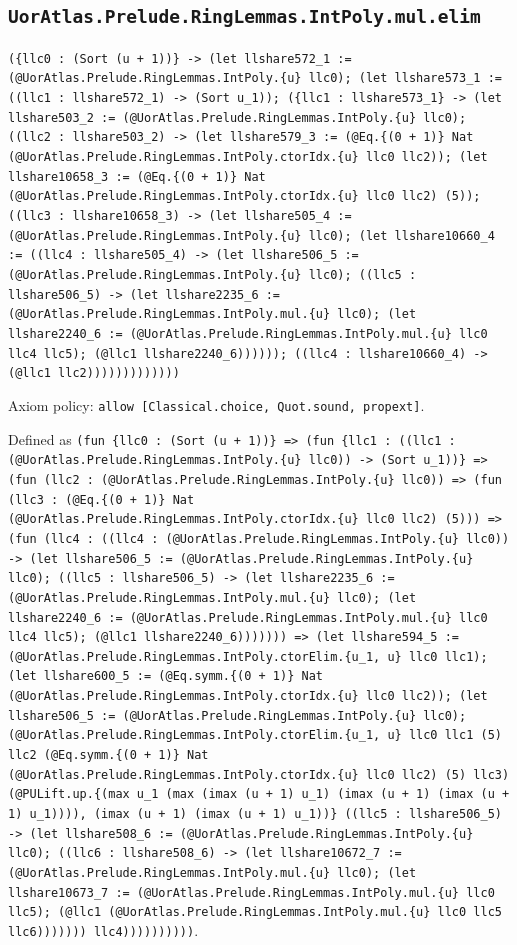 \documentclass[11pt]{article}
\begin{document}
\subsection*{\texttt{UorAtlas.Prelude.RingLemmas.IntPoly.mul.elim}}
\noindent\texttt{(\{llc0 : (Sort (u + 1))\} -> (let llshare572\_1 := (@UorAtlas.Prelude.RingLemmas.IntPoly.\{u\} llc0); (let llshare573\_1 := ((llc1 : llshare572\_1) -> (Sort u\_1)); (\{llc1 : llshare573\_1\} -> (let llshare503\_2 := (@UorAtlas.Prelude.RingLemmas.IntPoly.\{u\} llc0); ((llc2 : llshare503\_2) -> (let llshare579\_3 := (@Eq.\{(0 + 1)\} Nat (@UorAtlas.Prelude.RingLemmas.IntPoly.ctorIdx.\{u\} llc0 llc2)); (let llshare10658\_3 := (@Eq.\{(0 + 1)\} Nat (@UorAtlas.Prelude.RingLemmas.IntPoly.ctorIdx.\{u\} llc0 llc2) (5)); ((llc3 : llshare10658\_3) -> (let llshare505\_4 := (@UorAtlas.Prelude.RingLemmas.IntPoly.\{u\} llc0); (let llshare10660\_4 := ((llc4 : llshare505\_4) -> (let llshare506\_5 := (@UorAtlas.Prelude.RingLemmas.IntPoly.\{u\} llc0); ((llc5 : llshare506\_5) -> (let llshare2235\_6 := (@UorAtlas.Prelude.RingLemmas.IntPoly.mul.\{u\} llc0); (let llshare2240\_6 := (@UorAtlas.Prelude.RingLemmas.IntPoly.mul.\{u\} llc0 llc4 llc5); (@llc1 llshare2240\_6)))))); ((llc4 : llshare10660\_4) -> (@llc1 llc2)))))))))))))}\par
\noindent Axiom policy: \texttt{allow [Classical.choice, Quot.sound, propext]}.\par
\noindent Defined as \texttt{(fun \{llc0 : (Sort (u + 1))\} => (fun \{llc1 : ((llc1 : (@UorAtlas.Prelude.RingLemmas.IntPoly.\{u\} llc0)) -> (Sort u\_1))\} => (fun (llc2 : (@UorAtlas.Prelude.RingLemmas.IntPoly.\{u\} llc0)) => (fun (llc3 : (@Eq.\{(0 + 1)\} Nat (@UorAtlas.Prelude.RingLemmas.IntPoly.ctorIdx.\{u\} llc0 llc2) (5))) => (fun (llc4 : ((llc4 : (@UorAtlas.Prelude.RingLemmas.IntPoly.\{u\} llc0)) -> (let llshare506\_5 := (@UorAtlas.Prelude.RingLemmas.IntPoly.\{u\} llc0); ((llc5 : llshare506\_5) -> (let llshare2235\_6 := (@UorAtlas.Prelude.RingLemmas.IntPoly.mul.\{u\} llc0); (let llshare2240\_6 := (@UorAtlas.Prelude.RingLemmas.IntPoly.mul.\{u\} llc0 llc4 llc5); (@llc1 llshare2240\_6))))))) => (let llshare594\_5 := (@UorAtlas.Prelude.RingLemmas.IntPoly.ctorElim.\{u\_1, u\} llc0 llc1); (let llshare600\_5 := (@Eq.symm.\{(0 + 1)\} Nat (@UorAtlas.Prelude.RingLemmas.IntPoly.ctorIdx.\{u\} llc0 llc2)); (let llshare506\_5 := (@UorAtlas.Prelude.RingLemmas.IntPoly.\{u\} llc0); (@UorAtlas.Prelude.RingLemmas.IntPoly.ctorElim.\{u\_1, u\} llc0 llc1 (5) llc2 (@Eq.symm.\{(0 + 1)\} Nat (@UorAtlas.Prelude.RingLemmas.IntPoly.ctorIdx.\{u\} llc0 llc2) (5) llc3) (@PULift.up.\{(max u\_1 (max (imax (u + 1) u\_1) (imax (u + 1) (imax (u + 1) u\_1)))), (imax (u + 1) (imax (u + 1) u\_1))\} ((llc5 : llshare506\_5) -> (let llshare508\_6 := (@UorAtlas.Prelude.RingLemmas.IntPoly.\{u\} llc0); ((llc6 : llshare508\_6) -> (let llshare10672\_7 := (@UorAtlas.Prelude.RingLemmas.IntPoly.mul.\{u\} llc0); (let llshare10673\_7 := (@UorAtlas.Prelude.RingLemmas.IntPoly.mul.\{u\} llc0 llc5); (@llc1 (@UorAtlas.Prelude.RingLemmas.IntPoly.mul.\{u\} llc0 llc5 llc6))))))) llc4))))))))))}.\par
\end{document}
